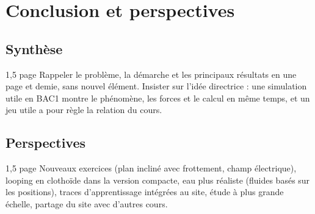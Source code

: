 
\chapter{Conclusion et perspectives}
\label{chap:conclusion}

\section{Synthèse}

\begin{arediger}{1,5 page}
Rappeler le problème, la démarche et les principaux résultats en une page et
demie, sans nouvel élément. Insister sur l'idée directrice : une simulation
utile en BAC1 montre le phénomène, les forces et le calcul en même temps, et un
jeu utile a pour règle la relation du cours.
\end{arediger}

\section{Perspectives}

\begin{arediger}{1,5 page}
Nouveaux exercices (plan incliné avec frottement, champ électrique),
looping en clothoïde dans la version compacte, eau plus réaliste (fluides
basés sur les positions), traces d'apprentissage intégrées au site, étude à
plus grande échelle, partage du site avec d'autres cours.
\end{arediger}
